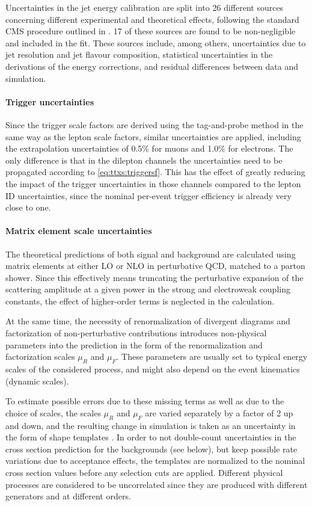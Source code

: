 Uncertainties in the jet energy calibration are split into 26 different sources concerning different experimental and theoretical effects, following the standard CMS procedure outlined in . 17 of these sources are found to be non-negligible and included in the fit. These sources include, among others, uncertainties due to jet \pt resolution and jet flavour composition, statistical uncertainties in the derivations of the energy corrections, and residual differences between data and simulation.

\paragraph{Trigger uncertainties}

Since the trigger scale factors are derived using the tag-and-probe method in the same way as the lepton scale factors, similar uncertainties are applied, including the extrapolation uncertainties of 0.5\% for muons and 1.0\% for electrons. The only difference is that in the dilepton channels the uncertainties need to be propagated according to \cref{eq:ttxs:triggersf}. This has the effect of greatly reducing the impact of the trigger uncertainties in those channels compared to the lepton ID uncertainties, since the nominal per-event trigger efficiency is already very close to one.

\paragraph{Matrix element scale uncertainties}

The theoretical predictions of both signal and background are calculated using matrix elements at either LO or NLO in perturbative QCD, matched to a parton shower. Since this effectively means truncating the perturbative expansion of the scattering amplitude at a given power in the strong and electroweak coupling constants, the effect of higher-order terms is neglected in the calculation.

At the same time, the necessity of renormalization of divergent diagrams and factorization of non-perturbative contributions introduces non-physical parameters into the prediction in the form of the renormalization and factorization scales $\mu_R$ and $\mu_F$. These parameters are usually set to typical energy scales of the considered process, and might also depend on the event kinematics (dynamic scales).

To estimate possible errors due to these missing terms as well as due to the choice of scales, the scales $\mu_R$ and $\mu_F$ are varied separately by a factor of 2 up and down, and the resulting change in simulation is taken as an uncertainty in the form of shape templates \cite{Cacciari:2004}. In order to not double-count uncertainties in the cross section prediction for the backgrounds (see below), but keep possible rate variations due to acceptance effects, the templates are normalized to the nominal cross section values before any selection cuts are applied. Different physical processes are considered to be uncorrelated since they are produced with different generators and at different orders. 

